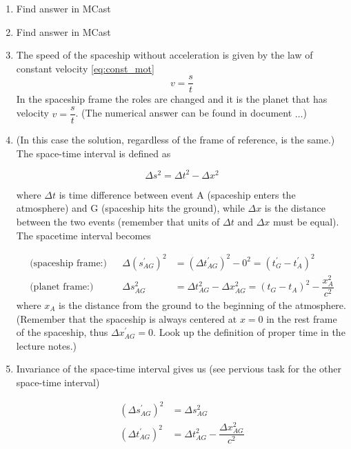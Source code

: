 \documentclass[a4paper,10pt,english]{article}
\begin{document}
\begin{enumerate}

\item Find answer in MCast

\item Find answer in MCast\\

\item The speed of the spaceship without acceleration is given by the law of constant velocity \ref{eq:const_mot}
\[v=\dfrac{s}{t}\]
In the spaceship frame the roles are changed and it is the planet that has velocity $v=\dfrac{s}{t}$. (The numerical answer can be found in document $\ldots$)

\item (In this case the solution, regardless of the frame of reference, is the same.) The space-time interval is defined as

\begin{equation*}
\Delta s^2=\Delta t^2-\Delta x^2
\end{equation*}

where $\Delta t$ is time difference between event A (spaceship enters the atmosphere) and G (spaceship hits the ground), while $\Delta x$ is the distance between the two events (remember that units of $\Delta t$ and $\Delta x$ must be equal). The spacetime interval becomes

\begin{align*}
\text{(spaceship frame:)} && \Delta (s_{AG}^{\prime})^2&=(\Delta t_{AG}^{\prime})^{2}-0^{2}=\left(t_G^{\prime}-t_A^{\prime}\right)^2\\
\text{(planet frame:)} && \Delta s_{AG}^2&=\Delta t_{AG}^2-\Delta x_{AG}^2=\left(t_G-t_A\right)^2-\dfrac{x_A^2}{c^2}
\end{align*}
where $x_A$ is the distance from the ground to the beginning of the atmosphere.\\ (Remember that the spaceship is always centered at $x=0$ in the rest frame of the spaceship, thus $\Delta x^{\prime}_{AG}=0$. Look up the definition of proper time in the lecture notes.)

\item Invariance of the space-time interval gives us (see pervious task for the other space-time interval)

\begin{align*}
(\Delta s_{AG}^{\prime})^{2}&=\Delta s_{AG}^{2}\\
(\Delta t_{AG}^{\prime})^2&=\Delta t_{AG}^2-\dfrac{\Delta x_{AG}^2}{c^2}
\end{align*}


\end{enumerate}
\end{document}
